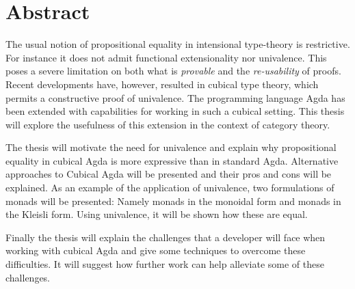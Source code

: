 \chapter*{Abstract}
The usual notion of propositional equality in intensional type-theory
is restrictive.  For instance it does not admit functional
extensionality nor univalence.  This poses a severe limitation on both
what is \emph{provable} and the \emph{re-usability} of proofs.  Recent
developments have, however, resulted in cubical type theory, which
permits a constructive proof of univalence.  The programming language
Agda has been extended with capabilities for working in such a cubical
setting.  This thesis will explore the usefulness of this extension in
the context of category theory.

The thesis will motivate the need for univalence and explain why
propositional equality in cubical Agda is more expressive than in
standard Agda.  Alternative approaches to Cubical Agda will be
presented and their pros and cons will be explained.  As an example of
the application of univalence, two formulations of monads will be
presented: Namely monads in the monoidal form and monads in the
Kleisli form.  Using univalence, it will be shown how these are equal.

Finally the thesis will explain the challenges that a developer will
face when working with cubical Agda and give some techniques to
overcome these difficulties.  It will suggest how further work can
help alleviate some of these challenges.
